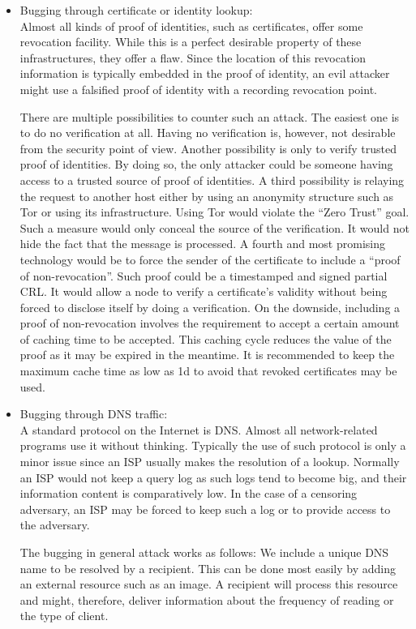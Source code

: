 \begin{itemize}
	\item Bugging through certificate or identity lookup:\\
	Almost all kinds of proof of identities, such as certificates, offer some revocation facility. While this is a perfect desirable property of these infrastructures, they offer a flaw. Since the location of this revocation information is typically embedded in the proof of identity, an evil attacker might use a falsified proof of identity with a recording revocation point.
	
	There are multiple possibilities to counter such an attack. The easiest one is to do no verification at all. Having no verification is, however, not desirable from the security point of view. Another possibility is only to verify trusted proof of identities. By doing so, the only attacker could be someone having access to a trusted source of proof of identities. A third possibility is relaying the request to another host either by using an anonymity structure such as Tor or using its infrastructure. Using Tor would violate the ``Zero Trust'' goal. Such a measure would only conceal the source of the verification. It would not hide the fact that the message is processed. A fourth and most promising technology would be to force the sender of the certificate to include a ``proof of non-revocation''. Such proof could be a timestamped and signed partial CRL. It would allow a node to verify a certificate's validity without being forced to disclose itself by doing a verification. On the downside, including a proof of non-revocation involves the requirement to accept a certain amount of caching time to be accepted. This caching cycle reduces the value of the proof as it may be expired in the meantime. It is recommended to keep the maximum cache time as low as 1d to avoid that revoked certificates may be used. 
	
	\item Bugging through DNS traffic:\\
	A standard protocol on the Internet is DNS. Almost all network-related programs use it without thinking. Typically the use of such protocol is only a minor issue since an ISP usually makes the resolution of a lookup. Normally an ISP would not keep a query log as such logs tend to become big, and their information content is comparatively low. In the case of a censoring adversary, an ISP may be forced to keep such a log or to provide access to the adversary.
	
	The bugging in general attack works as follows: We include a unique DNS name to be resolved by a recipient. This can be done most easily by adding an external resource such as an image. A recipient will process this resource and might, therefore, deliver information about the frequency of reading or the type of client. 
	

\end{itemize}
